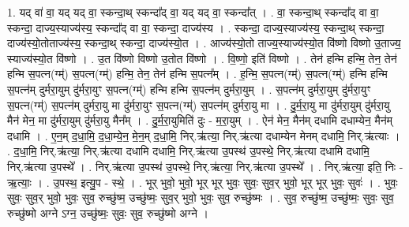 \documentclass[17pt]{extarticle}
\begin{document}
1. यद् वा॑ वा॒ यद् यद् वा॒ स्कन्दा॒थ् स्कन्दा᳚द् वा॒ यद् यद् वा॒ स्कन्दा᳚त् । . वा॒ स्कन्दा॒थ् स्कन्दा᳚द् वा वा॒ स्कन्दा॒ दाज्य॒स्याज्य॑स्य॒ स्कन्दा᳚द् वा वा॒ स्कन्दा॒ दाज्य॑स्य । . स्कन्दा॒ दाज्य॒स्याज्य॑स्य॒ स्कन्दा॒थ् स्कन्दा॒ दाज्य॑स्यो॒तोताज्य॑स्य॒ स्कन्दा॒थ् स्कन्दा॒ दाज्य॑स्यो॒त । . आज्य॑स्यो॒तो ताज्य॒स्याज्य॑स्यो॒त वि॑ष्णो विष्णो उ॒ताज्य॒ स्याज्य॑स्यो॒त वि॑ष्णो । . उ॒त वि॑ष्णो विष्णो उ॒तोत वि॑ष्णो । . वि॒ष्णो॒ इति॑ विष्णो । . तेन॑ हन्मि हन्मि॒ तेन॒ तेन॑ हन्मि स॒पत्न(ग्म्॑) स॒पत्न(ग्म्॑) हन्मि॒ तेन॒ तेन॑ हन्मि स॒पत्न᳚म् । . ह॒न्मि॒ स॒पत्न(ग्म्॑) स॒पत्न(ग्म्॑) हन्मि हन्मि स॒पत्न॑म् दुर्मरा॒युम् दु॑र्मरा॒युꣳ स॒पत्न(ग्म्॑) हन्मि हन्मि स॒पत्न॑म् दुर्मरा॒युम् । . स॒पत्न॑म् दुर्मरा॒युम् दु॑र्मरा॒युꣳ स॒पत्न(ग्म्॑) स॒पत्न॑म् दुर्मरा॒यु मा दु॑र्मरा॒युꣳ स॒पत्न(ग्म्॑) स॒पत्न॑म् दुर्मरा॒यु मा । . दु॒र्म॒रा॒यु मा दु॑र्मरा॒युम् दु॑र्मरा॒यु मैन॑ मेन॒ मा दु॑र्मरा॒युम् दु॑र्मरा॒यु मैन᳚म् । . दु॒र्म॒रा॒युमिति॑ दुः - म॒रा॒युम् । . ऐन॑ मेन॒ मैन॑म् दधामि दधाम्येन॒ मैन॑म् दधामि । . ए॒न॒म् द॒धा॒मि॒ द॒धा॒म्ये॒न॒ मे॒न॒म् द॒धा॒मि॒ निर्.ऋ॑त्या॒ निर्.ऋ॑त्या दधाम्येन मेनम् दधामि॒ निर्.ऋ॑त्याः । . द॒धा॒मि॒ निर्.ऋ॑त्या॒ निर्.ऋ॑त्या दधामि दधामि॒ निर्.ऋ॑त्या उ॒पस्थ॑ उ॒पस्थे॒ निर्.ऋ॑त्या दधामि दधामि॒ निर्.ऋ॑त्या उ॒पस्थे᳚ । . निर्.ऋ॑त्या उ॒पस्थ॑ उ॒पस्थे॒ निर्.ऋ॑त्या॒ निर्.ऋ॑त्या उ॒पस्थे᳚ । . निर्.ऋ॑त्या॒ इति॒ निः - ऋ॒त्याः॒ । . उ॒पस्थ॒ इत्यु॒प - स्थे॒ । . भूर् भुवो॒ भुवो॒ भूर् भूर् भुवः॒ सुवः॒ सुव॒र् भुवो॒ भूर् भूर् भुवः॒ सुवः॑ । . भुवः॒ सुवः॒ सुव॒र् भुवो॒ भुवः॒ सुव॒ रुच्छु॑ष्म॒ उच्छु॑ष्मः॒ सुव॒र् भुवो॒ भुवः॒ सुव॒ रुच्छु॑ष्मः । . सुव॒ रुच्छु॑ष्म॒ उच्छु॑ष्मः॒ सुवः॒ सुव॒ रुच्छु॑ष्मो अग्ने ऽग्न॒ उच्छु॑ष्मः॒ सुवः॒ सुव॒ रुच्छु॑ष्मो अग्ने । \newline
\end{document}

